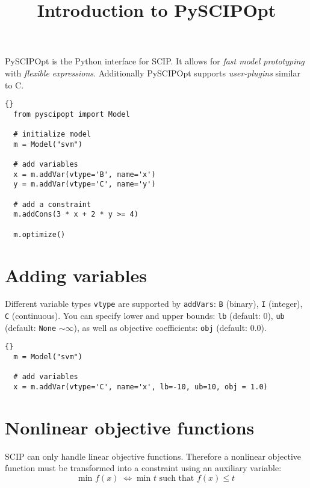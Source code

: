 \documentclass[11pt]{article}
\title{Introduction to PySCIPOpt}
\newcommand\ttt\texttt
\begin{document}
\maketitle

PySCIPOpt is the Python interface for SCIP.
It allows for \emph{fast model prototyping} with \emph{flexible expressions}.
Additionally PySCIPOpt supports \emph{user-plugins} similar to C.

\begin{lstlisting}[frame=tb]{}
  from pyscipopt import Model

  # initialize model
  m = Model("svm")

  # add variables
  x = m.addVar(vtype='B', name='x')
  y = m.addVar(vtype='C', name='y')

  # add a constraint
  m.addCons(3 * x + 2 * y >= 4)

  m.optimize()
\end{lstlisting}

\section*{Adding variables}

Different variable types \ttt{vtype} are supported by \ttt{addVars}: \ttt{B} (binary), \ttt{I} (integer), \ttt{C} (continuous).
You can specify lower and upper bounds: \ttt{lb} (default: 0), \ttt{ub} (default: \ttt{None} $\sim \infty$), as well as objective coefficients: \ttt{obj} (default: $0.0$).


\begin{lstlisting}[frame=tb]{}
  m = Model("svm")

  # add variables
  x = m.addVar(vtype='C', name='x', lb=-10, ub=10, obj = 1.0)
\end{lstlisting}

\section*{Nonlinear objective functions}

SCIP can only handle linear objective functions.
Therefore a nonlinear objective function must be transformed into a constraint using an auxiliary variable:
$$ \text{min } f(x) \; \Leftrightarrow \; \text{min } t \text{ such that } f(x) \leq t $$
\end{document}
